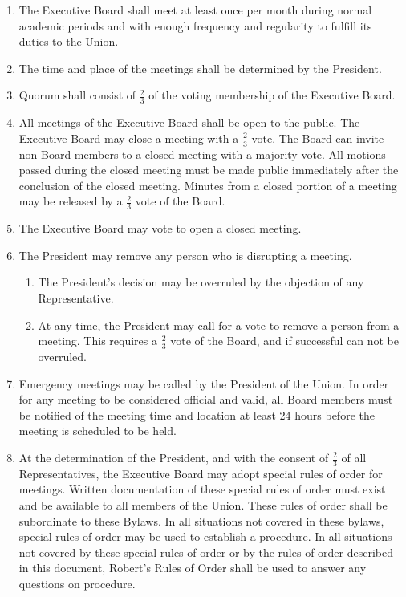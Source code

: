 
\begin{enumerate}

    \item The Executive Board shall meet at least once per month during normal academic periods and with enough frequency and regularity to fulfill its duties to the Union.

    \item The time and place of the meetings shall be determined by the President.

    \item Quorum shall consist of $\frac{2}{3}$ of the voting membership of the Executive Board.

    \item All meetings of the Executive Board shall be open to the public. The Executive Board may close a meeting with a $\frac{2}{3}$ vote. The Board can invite non-Board members to a closed meeting with a majority vote. All motions passed during the closed meeting must be made public immediately after the conclusion of the closed meeting. Minutes from a closed portion of a meeting may be released by a $\frac{2}{3}$ vote of the Board.

    \item The Executive Board may vote to open a closed meeting.

    \item The President may remove any person who is disrupting a meeting.
    \begin{enumerate}
        \item The President’s decision may be overruled by the objection of any Representative.
        \item At any time, the President may call for a vote to remove a person from a meeting. This requires a $\frac{2}{3}$ vote of the Board, and if successful can not be overruled.
    \end{enumerate}

    \item Emergency meetings may be called by the President of the Union. In order for any meeting to be considered official and valid, all Board members must be notified of the meeting time and location at least 24 hours before the meeting is scheduled to be held.

    \item At the determination of the President, and with the consent of $\frac{2}{3}$ of all Representatives, the Executive Board may adopt special rules of order for meetings. Written documentation of these special rules of order must exist and be available to all members of the Union. These rules of order shall be subordinate to these Bylaws. In all situations not covered in these bylaws, special rules of order may be used to establish a procedure. In all situations not covered by these special rules of order or by the rules of order described in this document, Robert’s Rules of Order shall be used to answer any questions on procedure.

\end{enumerate}
